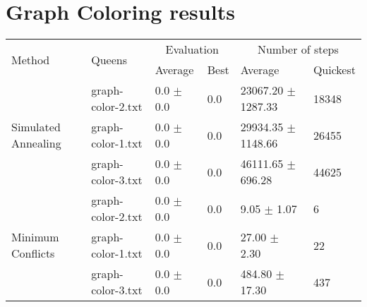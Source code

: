 \section{Graph Coloring results}

\begin{table*}\centering
    \caption{}
    \label{tab:graphcoloring}
	\vspace{2mm}
	\begin{tabular}{llllll}
		\toprule[2.0px]
			\multirow{2}{*}{Method} & 
			\multirow{2}{*}{Queens} & 
			\multicolumn{2}{c}{Evaluation} 	& 
			\multicolumn{2}{c}{Number of steps}\\
			   &          & Average & Best & Average & Quickest \\ 
		\midrule
		\multirow{3}{*}{Simulated Annealing} 
			& graph-color-2.txt & 0.0 $\pm$ 0.0 & 0.0 & 23067.20 $\pm$ 1287.33 & 18348\\ %
			& graph-color-1.txt & 0.0 $\pm$ 0.0 & 0.0 & 29934.35 $\pm$ 1148.66 & 26455\\ %
			& graph-color-3.txt & 0.0 $\pm$ 0.0 & 0.0 & 46111.65 $\pm$ 696.28 & 44625 \\ %
		\multirow{3}{*}{Minimum Conflicts}
			& graph-color-2.txt & 0.0 $\pm$ 0.0 & 0.0 & 9.05 $\pm$ 1.07 & 6\\ %
			& graph-color-1.txt & 0.0 $\pm$ 0.0 & 0.0 & 27.00 $\pm$ 2.30 & 22\\ %
			& graph-color-3.txt & 0.0 $\pm$ 0.0 & 0.0 & 484.80 $\pm$ 17.30 & 437 \\ %
		\bottomrule[2.0px]
	\end{tabular}
\end{table*}